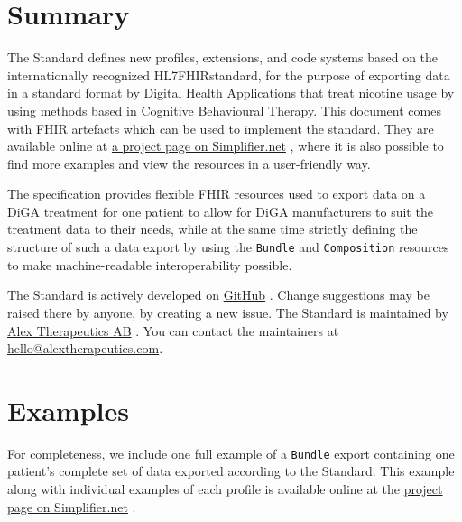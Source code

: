 \documentclass[12px]{report}
\def\code#1{\texttt{#1}} %
\newcommand{\fhir}{FHIR\textsuperscript{\textregistered}}
\newcommand{\hl}{HL7\textsuperscript{\textregistered}}
\begin{document}
\chapter{Summary}
\label{ch:sum}

The Standard defines new profiles, extensions, and code systems based on the internationally recognized \hl \fhir standard, 
for the purpose of exporting data in a standard format by Digital Health Applications that treat nicotine usage by using methods based in Cognitive Behavioural Therapy.
This document comes with FHIR artefacts which can be used to implement the standard. They are available online at \href{https://simplifier.net/treat-nicotine-usage-diga}{a project page on Simplifier.net} \cite{project}, where
it is also possible to find more examples and view the resources in a user-friendly way.

The specification provides flexible FHIR resources used to export data on a DiGA treatment for one patient to allow for DiGA manufacturers to suit the treatment data to their needs, 
while at the same time strictly defining the structure of such a data export by using the \code{Bundle} and \code{Composition} resources to make machine-readable interoperability possible.

The Standard is actively developed on \href{https://github.com/alex-therapeutics/diga-nicotine-usage-fhir}{GitHub} \cite{github}. Change suggestions may be raised there by anyone, by creating a new issue.
The Standard is maintained by \href{https://www.alextherapeutics.com}{Alex Therapeutics AB} \cite{alex}. You can contact the maintainers at \href{mailto:hello@alextherapeutics.com}{hello@alextherapeutics.com}.

\printbibliography[heading=bibintoc, title={References}]

\appendix

\chapter{Examples}
\label{app:ex}

For completeness, we include one full example of a \code{Bundle} export containing one patient's complete set of data exported according to the Standard.
This example along with individual examples of each profile is available online at the \href{https://simplifier.net/treat-nicotine-usage-diga}{project page on Simplifier.net} \cite{project}.


% 
\end{document}
